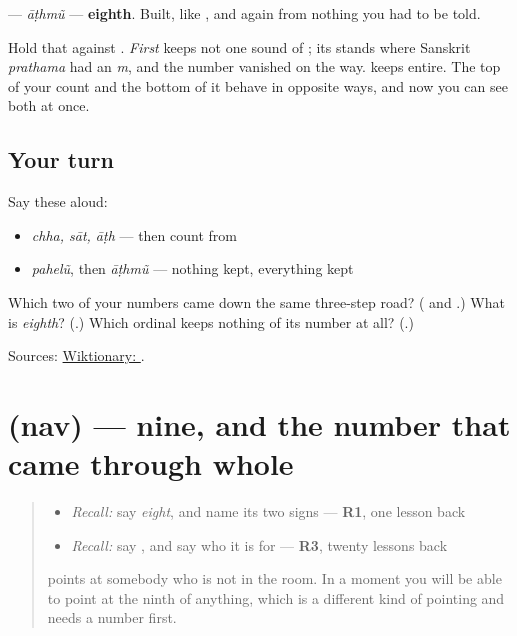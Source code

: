 \begin{grammarlens}[title={What you've built: a number that keeps everything}]
\textbf{} — \emph{āṭhmũ} — \textbf{eighth}. Built, like \textbf{}, and again from nothing you had to be told.

Hold that against \textbf{}. \emph{First} keeps not one sound of \textbf{}; its \textbf{} stands where Sanskrit \emph{prathama} had an \emph{m}, and the number vanished on the way. \textbf{} keeps \textbf{} entire. The top of your count and the bottom of it behave in opposite ways, and now you can see both at once.
\end{grammarlens}

\subsection*{Your turn}
Say these aloud:

\begin{itemize}
\raggedright
  \item \emph{chha, sāt, āṭh} — then count from \textbf{}
  \item \emph{pahelũ}, then \emph{āṭhmũ} — nothing kept, everything kept
\end{itemize}

\begin{tcolorbox}[breakable,colback=teal!4,colframe=teal!35!black,title={Before you move on}]
Which two of your numbers came down the same three-step road? (\textbf{} and \textbf{}.) What is \emph{eighth}? (\textbf{}.) Which ordinal keeps nothing of its number at all? (\textbf{}.)

Sources: \href{https://en.wiktionary.org/wiki/\%E0\%AA\%86\%E0\%AA\%A0}{Wiktionary: }.
\end{tcolorbox}
\section[\texorpdfstring{\gu{નવ} (nav)}{નવ (nav)}]{ (nav) — nine, and the number that came through whole}

\label{lesson:GU-C39-nav}



\begin{quote}
\begin{itemize}
\raggedright
  \item \emph{Recall:} say \emph{eight}, and name its two signs — \textbf{R1}, one lesson back
  \item \emph{Recall:} say \textbf{}, and say who it is for — \textbf{R3}, twenty lessons back
\end{itemize}

\textbf{} points at somebody who is not in the room. In a moment you will be able to point at the ninth of anything, which is a different kind of pointing and needs a number first.
\end{quote}


